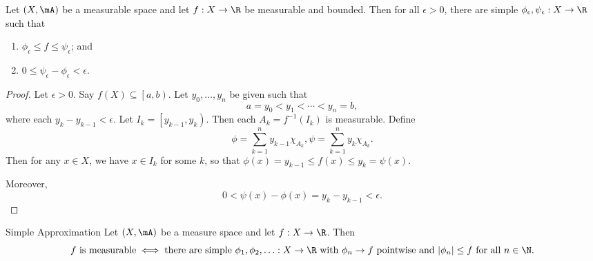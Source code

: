 \documentclass[pmath451]{subfiles}
\begin{document}
    \begin{prop}{}
        Let $\left( X,\mA \right)$ be a measurable space and let $f:X\to\R$ be measurable and bounded. Then for all $\epsilon>0$, there are simple $\phi_{\epsilon},\psi_{\epsilon}:X\to\R$ such that
        \begin{enumerate}
            \item $\phi_{\epsilon}\leq f\leq\psi_{\epsilon}$; and
            \item $0\leq\psi_{\epsilon}-\phi_{\epsilon}<\epsilon$.
        \end{enumerate}
    \end{prop}
    
    \begin{proof}
        Let $\epsilon>0$. Say $f\left( X \right)\subseteq\left[ a,b \right)$. Let $y_0,\ldots,y_n$ be given such that
        \begin{equation*}
            a = y_0 < y_1 < \cdots < y_n = b,
        \end{equation*}
        where each $y_k-y_{k-1}<\epsilon$. Let $I_k = \left[ y_{k-1},y_k \right)$. Then each $A_k = f^{-1}\left( I_k \right)$ is measurable. Define
        \begin{equation*}
            \phi = \sum^{n}_{k=1} y_{k-1}\chi_{A_k}, \psi = \sum^{n}_{k=1}y_k\chi_{A_k}.
        \end{equation*}
        Then for any $x\in X$, we have $x\in I_k$ for some $k$, so that $\phi\left( x \right) = y_{k-1} \leq f\left( x \right) \leq y_k = \psi\left( x \right)$.

        Moreover,
        \begin{equation*}
            0 < \psi\left( x \right) - \phi\left( x \right) = y_k-y_{k-1} < \epsilon.
        \end{equation*}
    \end{proof}

    \clearpage

    \begin{theorem}{Simple Approximation}
        Let $\left( X,\mA \right)$ be a measure space and let $f:X\to\R$. Then
        \begin{equation*}
            \text{$f$ is measurable} \iff \text{there are simple $\phi_1,\phi_2,\ldots:X\to\R$ with $\phi_n\to f$ pointwise and $\left| \phi_n \right|\leq f$ for all $n\in\N$}.
        \end{equation*}
    \end{theorem}
    
\end{document}
